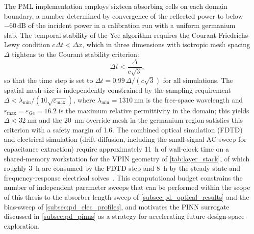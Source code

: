 The PML implementation employs sixteen absorbing cells on each domain
boundary, a number determined by convergence of the reflected power to below
$-60\,\mathrm{dB}$ of the incident power in a calibration run with a uniform
germanium slab. The temporal stability of the Yee algorithm requires the
Courant-Friedrichs-Lewy condition $c\Delta t < \Delta x$, which in three
dimensions with isotropic mesh spacing $\Delta$ tightens to the Courant
stability criterion:
\begin{equation}
    \Delta t < \frac{\Delta}{c\sqrt{3}},
    \label{eq:cfl_3d}
\end{equation}
so that the time step is set to $\Delta t = 0.99\,\Delta/(c\sqrt{3})$ for
all simulations. The spatial mesh size is independently constrained by the
sampling requirement $\Delta < \lambda_{\min}/(10\sqrt{\varepsilon_{\max}})$,
where $\lambda_{\min} = \SI{1310}{\nano\metre}$ is the free-space wavelength
and $\varepsilon_{\max} = \varepsilon_{\mathrm{Ge}} = 16.2$ is the maximum
relative permittivity in the domain; this yields $\Delta < \SI{32}{\nano\metre}$
and the \SI{20}{\nano\metre} override mesh in the germanium region satisfies
this criterion with a safety margin of 1.6. The combined optical simulation
(FDTD) and electrical simulation (drift-diffusion, including the small-signal
AC sweep for capacitance extraction) require approximately \SI{11}{\hour} of
wall-clock time on a shared-memory workstation for the VPIN geometry of
\cref{tab:layer_stack}, of which roughly \SI{3}{\hour} are consumed by the
FDTD step and \SI{8}{\hour} by the steady-state and frequency-response
electrical solves~\cite{Alasio2024}. This computational budget constrains the
number of independent parameter sweeps that can be performed within the scope
of this thesis to the absorber length sweep of \cref{subsec:pd_optical_results}
and the bias-sweep of \cref{subsec:pd_elec_profiles}, and motivates the PINN
surrogate discussed in \cref{subsec:pd_pinns} as a strategy for accelerating
future design-space exploration.



